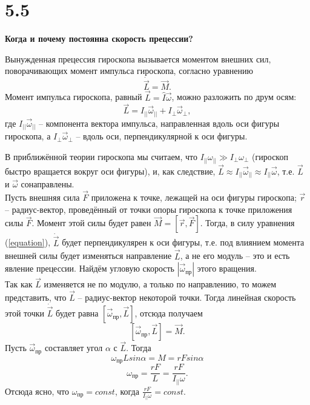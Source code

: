 \documentclass[a4paper,14pt]{article}
\begin{document}
\section*{5.5}

\begin{center}
	\LARGE{\textbf{Когда и почему постоянна скорость прецессии?}}\\
\end{center}

Вынужденная прецессия гироскопа вызывается моментом внешних сил, поворачивающих момент импульса гироскопа, согласно уравнению
\begin{equation}
    \dot{\vec{L}} = \vec{M}.
    \label{equation}
\end{equation}
Момент импульса гироскопа, равный $\vec{L} = \hat{I} \vec{\omega}$, можно разложить по друм осям:
$$
\vec{L} = I_{||} \vec{\omega}_{||} + I_{\perp} \vec{\omega}_{\perp},
$$
где $I_{||} \vec{\omega}_{||}$ -- компонента вектора импульса, направленная вдоль оси фигуры гироскопа, а $I_{\perp} \vec{\omega}_{\perp}$ -- вдоль оси, перпендикулярной к оси фигуры.

В приближённой теории гироскопа мы считаем, что $I_{||} \omega_{||} \gg I_{\perp} \omega_{\perp}$ (гироскоп быстро вращается вокруг оси фигуры), и, как следствие, $\vec{L} \approx I_{||} \vec{\omega}_{||} \approx I_{||} \vec{\omega}$, т.е. $\vec{L}$ и $\vec{\omega}$ сонаправлены.
\\
Пусть внешняя сила $\vec{F}$ приложена к точке, лежащей на оси фигуры гироскопа; $\vec{r}$ -- радиус-вектор, проведённый от точки опоры гироскопа к точке приложения силы $\vec{F}$. Момент этой силы будет равен $\vec{M} = [\vec{r},\vec{F}]$. Тогда, в силу уравнения (\ref{equation}), $\dot{\vec{L}}$ будет перпендикулярен к оси фигуры, т.е. под влиянием момента внешней силы будет изменяться направление $\vec{L}$, а не его модуль -- это и есть явление прецессии. Найдём угловую скорость $|\vec{\omega}_{пр}|$ этого вращения.
\\
Так как $\vec{L}$ изменяется не по модулю, а только по направлению, то можем представить, что $\vec{L}$ -- радиус-вектор некоторой точки. Тогда линейная скорость этой точки $\dot{\vec{L}}$ будет равна $[\vec{\omega}_{пр}, \vec{L}]$, отсюда получаем
$$
[\vec{\omega}_{пр}, \vec{L}] = \vec{M}.
$$
Пусть $\vec{\omega}_{пр}$ составляет угол $\alpha$ с $\vec{L}$. Тогда
$$
\omega_{пр} L sin \alpha = M = r F sin \alpha
$$
$$
\omega_{пр} = \frac{r F}{L} = \frac{r F}{I_{||} \omega}.
$$
Отсюда ясно, что $\omega_{пр} = const$, когда $\frac{r F}{I_{||} \omega} = const$.
\end{document}
